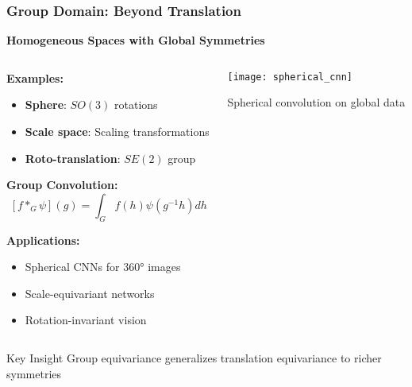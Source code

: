 \begin{frame}[fragile]\frametitle{Group Domain: Beyond Translation}

\begin{center}
\textbf{Homogeneous Spaces with Global Symmetries}
\end{center}

\begin{columns}
\begin{column}{0.5\textwidth}
\textbf{Examples:}
\begin{itemize}
\item \textbf{Sphere}: $SO(3)$ rotations
\item \textbf{Scale space}: Scaling transformations  
\item \textbf{Roto-translation}: $SE(2)$ group
\end{itemize}

\textbf{Group Convolution:}
$$[f *_G \psi](g) = \int_G f(h) \psi(g^{-1}h) dh$$

\textbf{Applications:}
\begin{itemize}
\item Spherical CNNs for 360° images
\item Scale-equivariant networks
\item Rotation-invariant vision
\end{itemize}
\end{column}
\begin{column}{0.5\textwidth}
\begin{center}
\texttt{[image: spherical\_cnn]}

\vspace{0.5cm}
{\small Spherical convolution on global data}
\end{center}
\end{column}
\end{columns}

\begin{block}{Key Insight}
Group equivariance generalizes translation equivariance to richer symmetries
\end{block}

\end{frame}


